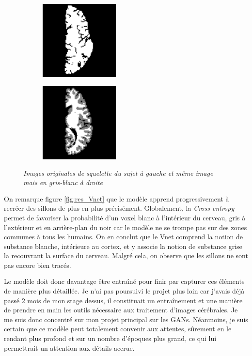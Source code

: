 \documentclass[12pt, oneside, a4paper, titlepage]{article}
\begin{document}
\begin{figure}[H]
\centering
\begin{subfigure}{.2\textwidth}
  \includegraphics[width=4cm, height=4cm]{data4_130.png}
  \label{fig:sub1}
\end{subfigure}%
\begin{subfigure}{.2\textwidth}
  \includegraphics[width=4cm, height=4cm]{target4_130.png}
  \label{fig:sub2}
\end{subfigure}
\caption{\textit{Images originales de squelette du sujet à gauche et même image mais en gris-blanc à droite}}
\label{fig:res_Unit2}
\end{figure}

\vspace{1cm}

On remarque figure \ref{fig:res_Vnet} que le modèle apprend progressivement à recréer des sillons de plus en plus précisément. Globalement, la \textit{Cross entropy} permet de favoriser la probabilité d'un voxel blanc à l'intérieur du cerveau, gris à l'extérieur et en arrière-plan du noir car le modèle ne se trompe pas sur des zones communes à tous les humains. On en conclut que le Vnet comprend la notion de substance blanche, intérieure au cortex, et y associe la notion de substance grise la recouvrant la surface du cerveau. Malgré cela, on observe que les sillons ne sont pas encore bien tracés. 

\vspace{5mm}

Le modèle doit donc davantage être entraîné pour finir par capturer ces éléments de manière plus détaillée. Je n'ai pas poursuivi le projet plus loin car j'avais déjà passé 2 mois de mon stage dessus, il constituait un entraînement et une manière de prendre en main les outils nécessaire aux traitement d'images cérébrales. Je me suis donc concentré sur mon projet principal sur les GANs. Néanmoins, je suis certain que ce modèle peut totalement convenir aux attentes, sûrement en le rendant plus profond et sur un nombre d'époques plus grand, ce qui lui permettrait un attention aux détails accrue.
\end{document}
